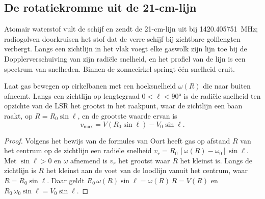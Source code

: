 \subsection*{De rotatiekromme uit de 21-cm-lijn}

Atomair waterstof vult de schijf en zendt de 21-cm-lijn uit bij
\qty{1420.405751}{MHz}; radiogolven doorkruisen het stof dat de
verre schijf bij zichtbare golflengten verbergt. Langs een zichtlijn
in het vlak voegt elke gaswolk zijn lijn toe bij de Dopplerverschuiving van
zijn radiële snelheid, en het profiel van de lijn is een spectrum van
snelheden. Binnen de zonnecirkel springt één snelheid eruit.

\begin{theorem}[Raakpuntmethode]\label{thm:b3:milky-way-galaxies:tangent}
Laat gas bewegen op cirkelbanen met een hoeksnelheid $\omega(R)$ die
naar buiten afneemt. Langs een zichtlijn op lengtegraad
$0 < \ell < \ang{90}$ is de radiële snelheid ten opzichte van de LSR het grootst
in het raakpunt, waar de zichtlijn een baan raakt, op
$R = R_0\sin\ell$, en de grootste waarde ervan is
\[
v_\mathrm{max} = V(R_0\sin\ell) - V_0\sin\ell .
\]
\end{theorem}

\begin{proof}
Volgens het bewijs van de formules van Oort heeft gas op afstand $R$ van het centrum
op de zichtlijn een radiële snelheid $v_r = R_0\,[\omega(R) - \omega_0]\sin\ell$. Met
$\sin\ell > 0$ en $\omega$ afnemend is $v_r$ het grootst waar $R$
het kleinst is. Langs de zichtlijn is $R$ het kleinst aan de voet van de
loodlijn vanuit het centrum, waar $R = R_0\sin\ell$. Daar geldt
$R_0\,\omega(R)\sin\ell = \omega(R)\,R = V(R)$ en
$R_0\,\omega_0\sin\ell = V_0\sin\ell$.
\end{proof}

